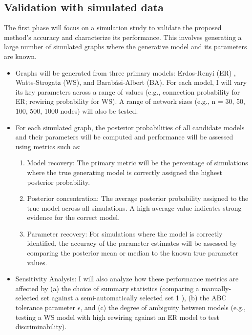\documentclass[stu,12pt,floatsintext]{apa7}
\begin{document}
\subsection{Validation with simulated data}

The first phase will focus on a simulation study to validate the proposed method's accuracy and characterize its performance. This involves generating a large number of simulated graphs where the generative model and its parameters are known.

\begin{itemize}

\item Graphs will be generated from three primary models: Erdos-Renyi (ER) , Watts-Strogatz (WS), and Barabási-Albert (BA). For each model, I will vary its key parameters across a range of values (e.g., connection probability for ER; rewiring probability for WS). A range of network sizes (e.g., n = 30, 50, 100, 500, 1000 nodes) will also be tested.

\item For each simulated graph, the posterior probabilities of all candidate models and their parameters will be computed and performance will be assessed using metrics such as: 
	
	\begin{enumerate}
     \item Model recovery: The primary metric will be the percentage of simulations where the true generating model is correctly assigned the highest posterior probability.
     \item Posterior concentration: The average posterior probability assigned to the true model across all simulations. A high average value indicates strong evidence for the correct model.
     \item Parameter recovery: For simulations where the model is correctly identified, the accuracy of the parameter estimates will be assessed by comparing the posterior mean or median to the known true parameter values.
     \end{enumerate}

\item Sensitivity Analysis: I will also analyze how these performance metrics are affected by (a) the choice of summary statistics (comparing a manually-selected set against a semi-automatically selected set 1 ), (b) the ABC tolerance parameter $\epsilon$, and (c) the degree of ambiguity between models (e.g., testing a WS model with high rewiring against an ER model to test discriminability). 
\end{itemize}
\end{document}
